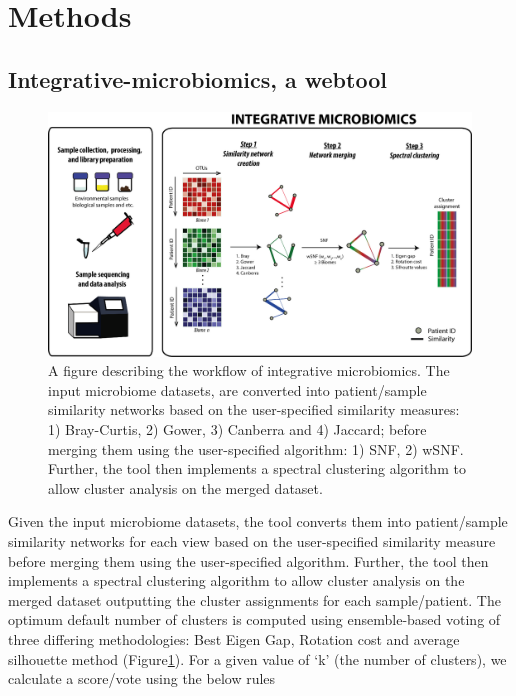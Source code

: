 \section{Methods}

\subsection{Integrative-microbiomics, a webtool}
\begin{figure}[h]
	\centering
	\includegraphics[width=\textwidth]{image/webtool_intro.png}
	\caption{A figure describing the workflow of integrative microbiomics. The input microbiome datasets, are converted into patient/sample similarity networks based on the user-specified similarity measures: 1) Bray-Curtis, 2) Gower, 3) Canberra and 4) Jaccard; before merging them using the user-specified algorithm: 1) SNF, 2) wSNF. Further, the tool then implements a spectral clustering algorithm to allow cluster analysis on the merged dataset.}
	\label{fig3}
\end{figure}

Given the input microbiome datasets, the tool converts them into patient/sample similarity networks for each view based on the user-specified similarity measure before merging them using the user-specified algorithm. Further, the tool then implements a spectral clustering algorithm to allow cluster analysis on the merged dataset outputting the cluster assignments for each sample/patient. The optimum default number of clusters is computed using ensemble-based voting of three differing methodologies: Best Eigen Gap, Rotation cost and average silhouette method (Figure\ref{fig3}). For a given value of `k' (the number of clusters), we calculate a score/vote using the below rules

